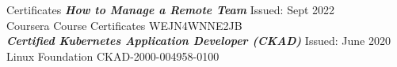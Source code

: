 \begin{section}{Certificates}
    {\sl \textbf{How to Manage a Remote Team}} \hfill Issued: Sept 2022\\
    Coursera Course Certificates \hfill WEJN4WNNE2JB \\

    {\sl \textbf{Certified Kubernetes Application Developer (CKAD)}} \hfill Issued: June 2020\\
    Linux Foundation \hfill CKAD-2000-004958-0100 \\
\end{section}